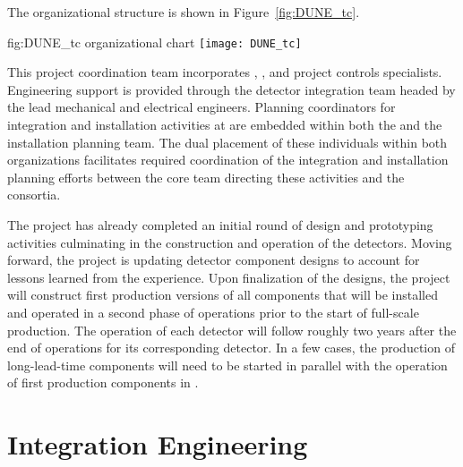 The   organizational structure is shown 
in Figure~\ref{fig:DUNE_tc}.  

\begin{dunefigure}{fig:DUNE_tc}
  {  organizational chart}
  \texttt{[image: DUNE\_tc]}
\end{dunefigure}

This project coordination team incorporates , 
, and project controls specialists.  Engineering support 
is provided through the  detector integration team 
headed by the lead  mechanical and electrical engineers.
Planning coordinators for integration and installation activities 
at  are embedded within both the  and the 
 installation planning team.  The dual placement of 
these individuals within both organizations facilitates required 
coordination of the integration and installation planning 
efforts between the core team directing these activities and the 
 consortia. %

The  project has already completed an initial round of design 
and prototyping activities culminating in the construction and operation 
of the  detectors.  Moving forward, the project is 
updating detector component designs to account for lessons learned from 
the  experience.  Upon finalization of the designs, the 
project will construct first production versions of all components that 
will be installed and operated in a second phase of  
operations prior to the start of full-scale production.  The operation 
of each  detector will follow roughly two years after
the end of operations for its corresponding  detector.
In a few cases, the production of long-lead-time components will need to 
be started in parallel with the operation of first production components 
in .

\section{Integration Engineering}
\label{sec:es-coord-integ-sysengr}

